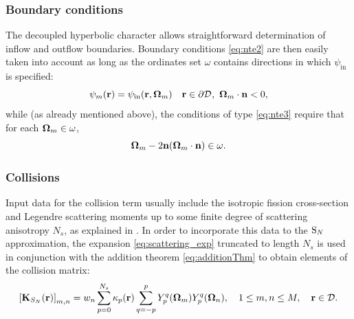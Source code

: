 \subsubsection{Boundary conditions}
The decoupled hyperbolic character allows straightforward determination of inflow and outflow boundaries. Boundary
conditions \eqref{eq:nte2} are then easily taken into account as long as the ordinates set $\omega$ contains directions
in which $\psi_{\text{in}}$ is specified:
\begin{equation}\label{eq:bc_sn}
	\psi_m(\br) = \psi_{\text{in}}(\br, \bomega_m)\quad \br\in\pV, \ \bomega_m\cdot\bn < 0,
\end{equation}	
while (as already mentioned above), the conditions of type
\eqref{eq:nte3} require that for each $\bomega_m\in\omega$, 
$$
	\bomega_m - 2 \bn (\bomega_m \cdot \bn) \in \omega.
$$ 


 
\subsubsection{Collisions}
Input data for the collision term usually include the isotropic fission cross-section and Legendre scattering moments up
to some finite degree of scattering anisotropy $N_s$, as explained in . In
order to incorporate this data to the $\SN$ approximation, the expansion \eqref{eq:scattering_exp} truncated to length
$N_s$ is used in conjunction with the addition theorem \eqref{eq:additionThm} to obtain elements of the collision
matrix:
$$
\left[\mathbf{K}_{S_N}(\br)\right]_{m,n} = 
w_n \suma[p]{0}{N_s}\kappa_p(\br)\suma[q]{-p}{p}\Y{p}{q}(\bomega_m)\Y{p}{q}(\bomega_n),\quad  1 \leq m,n \leq M, \quad
\br\in\VV.
$$

